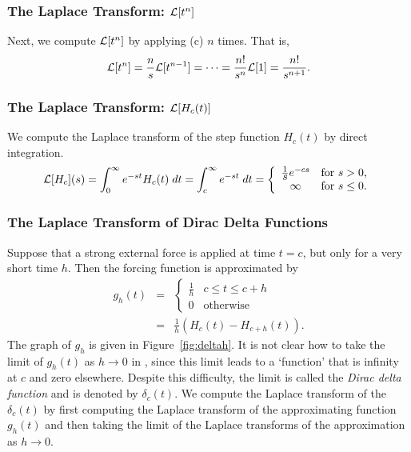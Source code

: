 \subsubsection*{The Laplace Transform: ${\cal L}[t^n]$}

Next, we compute ${\cal L}[t^n]$ by applying (c) $n$ times.
That is, 
\[
{\cal L}[t^n] = \frac{n}{s}{\cal L}[t^{n-1}] = \cdots =
\frac{n!}{s^n}{\cal L}[1] = \frac{n!}{s^{n+1}}.
\]

\subsubsection*{The Laplace Transform: ${\cal L}[H_c(t)]$}

We compute the Laplace transform of the step function $H_c(t)$ by direct 
integration.  
\[
{\cal L}[H_c](s) = \int_0^{\infty} e^{-st}H_c(t)\; dt
= \int_c^{\infty} e^{-st}\; dt
=\left\{ \begin{array}{cl} \frac{1}{\displaystyle s}e^{-cs} & \mbox{for $s>0$,}\\
\infty & \mbox{for $s\le 0$.}\end{array}\right.
\]


\subsubsection*{The Laplace Transform of Dirac Delta Functions}

Suppose that a strong external force is applied at time $t=c$, but only for a 
very short time $h$.  Then the forcing function is approximated by
\begin{equation}  \label{eq:deltah}
\begin{array}{rcl}
g_h(t) & =  & 
\left\{\begin{array}{cc} \frac{1}{h} & c\leq t \leq c+h \\ 
		0 & \mbox{otherwise} \end{array} \right. \\
 & = & \frac{1}{h} \left(H_c(t)-H_{c+h}(t)\right). 
\end{array}
\end{equation}
The graph of $g_h$ is given in Figure~\ref{fig:deltah}.  It is not clear how 
to take the limit of $g_h(t)$ as $h\to 0$ in , since this limit 
leads to a `function' that is infinity at $c$ and zero elsewhere.  Despite 
this difficulty, the limit is called the {\em Dirac delta function}
 and is denoted by $\delta_c(t)$.  We compute the 
Laplace transform of the $\delta_c(t)$ by first computing the Laplace 
transform of the approximating function $g_h(t)$ and then taking the limit of 
the Laplace transforms of the approximation as $h\to 0$.

